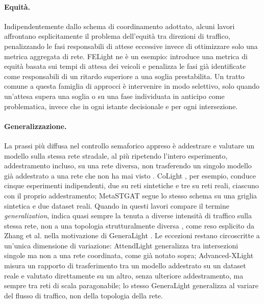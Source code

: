 \paragraph{Equità.} Indipendentemente dallo schema di coordinamento
adottato, alcuni lavori affrontano esplicitamente il problema
dell'equità tra direzioni di traffico, penalizzando le fasi responsabili
di attese eccessive invece di ottimizzare solo una metrica aggregata di
rete. FELight \citep{xiao2025tscreview} ne è un esempio: introduce una
metrica di equità basata sui tempi di attesa dei veicoli e penalizza le
fasi già identificate come responsabili di un ritardo superiore a una
soglia prestabilita. Un tratto comune a questa famiglia di approcci è
intervenire in modo selettivo, solo quando un'attesa supera una soglia o
su una fase individuata in anticipo come problematica, invece che in ogni
istante decisionale e per ogni intersezione.

\paragraph{Generalizzazione.} La prassi più
diffusa nel controllo semaforico appreso è addestrare e valutare un
modello sulla stessa rete stradale, al più ripetendo l'intero
esperimento, addestramento incluso, su una rete diversa, non trasferendo
un singolo modello già addestrato a una rete che non ha mai visto
\citep{wei2020tscsurvey}. CoLight \citep{wei2019colight}, per esempio,
conduce cinque esperimenti indipendenti, due su reti sintetiche e tre su
reti reali, ciascuno con il proprio addestramento; MetaSTGAT
\citep{wang2022metastgat} segue lo stesso schema su una griglia sintetica
e due dataset reali. Quando in questi lavori compare il termine
\emph{generalization}, indica quasi sempre la tenuta a diverse intensità
di traffico sulla stessa rete, non a una topologia strutturalmente
diversa \citep{wang2026astgcndrl, sun2026tgmaddpg}, come reso esplicito
da Zhang et al. nella motivazione di GeneraLight
\citep{zhang2020generalight}. Le eccezioni restano circoscritte a
un'unica dimensione di variazione: AttendLight generalizza tra
intersezioni singole ma non a una rete coordinata, come già notato sopra;
Advanced-XLight \citep{zhang2022advancedxlight} misura un rapporto di
trasferimento tra un modello addestrato su un dataset reale e valutato
direttamente su un altro, senza ulteriore addestramento, ma sempre tra
reti di scala paragonabile; lo stesso GeneraLight generalizza al variare
del flusso di traffico, non della topologia della rete.

